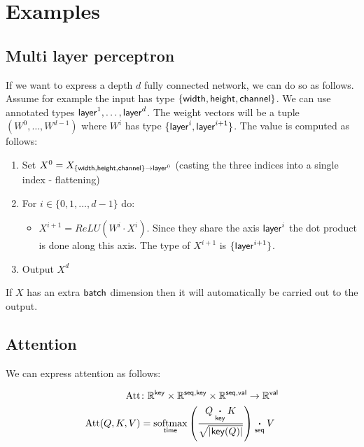 \documentclass{article}
\begin{document}
\section{Examples}
\label{sec:examples}

\subsection{Multi layer perceptron}

If we want to express a depth $d$ fully connected network, we can do so as follows.
Assume for example the input has type $\{ \name{width}, \name{height} , \name{channel} \}$.
We can use annotated types $\name{layer}^1,\ldots,\name{layer}^d$. 
The weight vectors will be a tuple $(W^0,\ldots,W^{d-1})$ where $W^i$ has type $\{ \name{layer}^{i},\name{layer}^{i+1} \}$.
The value is computed as follows:

\begin{enumerate}

\item Set $X^0 = X_{\{ \name{width}, \name{height} , \name{channel} \} \rightarrow \name{layer}^0 }$ (casting the three indices into a single index - flattening)

\item For $i \in \{0,1,\ldots, d-1\}$ do:


\begin{itemize}
    \item $X^{i+1} = ReLU(W^i \cdot X^i)$. Since they share the axis $\name{layer}^i$ the dot product is done along this axis. The type of $X^{i+1}$ is $\{ \name{layer}^{i+1} \}$.
\end{itemize}

\item Output $X^d$
\end{enumerate}

If $X$ has an extra $\name{batch}$ dimension then it will automatically be carried out to the output.



\subsection{Attention}

We can express attention as follows:


\begin{align*}
  \text{Att} &\colon \mathbb{R}^{\name{key}} \times \mathbb{R}^{\name{seq},\name{key}} \times \mathbb{R}^{\name{seq},\name{val}} \rightarrow \mathbb{R}^{\name{val}} \\
  \text{Att}(Q,K,V) &= \nfun{time}{softmax} \left( \frac{Q \ndot{key} K}{\sqrt{|\name{key}(Q)|}} \right) \nadot{\name{seq}} V
\end{align*}
\end{document}
